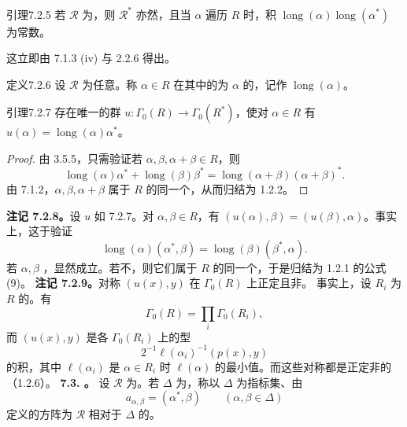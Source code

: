\begin{SGAresult}{引理}{7.2.5}
若 $\mathscr R$ 为，则 $\mathscr R^*$ 亦然，且当 $\alpha$ 遍历 $R$ 时，积 $\operatorname{long}(\alpha)\operatorname{long}(\alpha^*)$ 为常数。
\end{SGAresult}
这立即由 7.1.3 (iv) 与 2.2.6 得出。
\begin{SGAresult}{定义}{7.2.6}
设 $\mathscr R$ 为任意。称 $\alpha\in R$ 在其中的为 $\alpha$ 的，记作 $\operatorname{long}(\alpha)$。
\end{SGAresult}
\begin{SGAresult}{引理}{7.2.7}
存在唯一的群 $u:\Gamma_0(R)\to\Gamma_0(R^*)$，使对 $\alpha\in R$ 有 $u(\alpha)=\operatorname{long}(\alpha)\alpha^*$。
\end{SGAresult}
\begin{proof}
由 3.5.5，只需验证若 $\alpha,\beta,\alpha+\beta\in R$，则
\[\operatorname{long}(\alpha)\alpha^*+\operatorname{long}(\beta)\beta^*
=\operatorname{long}(\alpha+\beta)(\alpha+\beta)^*.\]
由 7.1.2，$\alpha,\beta,\alpha+\beta$ 属于 $R$ 的同一个，从而归结为 1.2.2。
\end{proof}
\textbf{注记 7.2.8。}设 $u$ 如 7.2.7。对 $\alpha,\beta\in R$，有 $(u(\alpha),\beta)=(u(\beta),\alpha)$。事实上，这于验证
\[\operatorname{long}(\alpha)(\alpha^*,\beta)=\operatorname{long}(\beta)(\beta^*,\alpha).\]
若 $\alpha,\beta$ ，显然成立。若不，则它们属于 $R$ 的同一个，于是归结为 1.2.1 的公式 (9)。
\textbf{注记 7.2.9。}对称 $(u(x),y)$ 在 $\Gamma_0(R)$ 上正定且非。
事实上，设 $R_i$ 为 $R$ 的。有
\[\Gamma_0(R)=\prod_i\Gamma_0(R_i),\]
而 $(u(x),y)$ 是各 $\Gamma_0(R_i)$ 上的型
\[2^{-1}\ell(\alpha_i)^{-1}(p(x),y)\]
的积，其中 $\ell(\alpha_i)$ 是 $\alpha\in R_i$ 时 $\ell(\alpha)$ 的最小值。而这些对称都是正定非的（1.2.6）。
\textbf{7.3. 。}
设 $\mathscr R$ 为。若 $\Delta$ 为，称以 $\Delta$ 为指标集、由
\[a_{\alpha,\beta}=(\alpha^*,\beta)\qquad(\alpha,\beta\in\Delta)\]
定义的方阵为 $\mathscr R$ 相对于 $\Delta$ 的。
